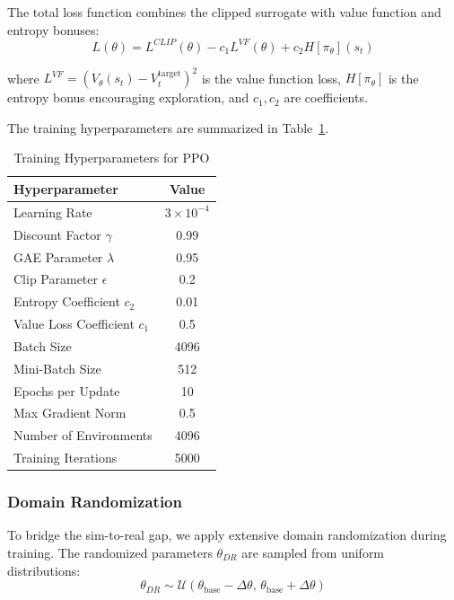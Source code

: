 The total loss function combines the clipped surrogate with value function and entropy bonuses:
\begin{equation}
    L(\theta) = L^{CLIP}(\theta) - c_1 L^{VF}(\theta) + c_2 H[\pi_\theta](s_t)
\end{equation}

where $L^{VF} = (V_\theta(s_t) - V_t^{\text{target}})^2$ is the value function loss, $H[\pi_\theta]$ is the entropy bonus encouraging exploration, and $c_1, c_2$ are coefficients.

The training hyperparameters are summarized in Table~\ref{tab:hyperparameters}.

\begin{table}[!t]
\renewcommand{\arraystretch}{1.3}
\caption{Training Hyperparameters for PPO}
\label{tab:hyperparameters}
\centering
\begin{tabular}{lc}
\hline\hline
\textbf{Hyperparameter} & \textbf{Value} \\ \hline
Learning Rate & $3 \times 10^{-4}$ \\
Discount Factor $\gamma$ & 0.99 \\
GAE Parameter $\lambda$ & 0.95 \\
Clip Parameter $\epsilon$ & 0.2 \\
Entropy Coefficient $c_2$ & 0.01 \\
Value Loss Coefficient $c_1$ & 0.5 \\
Batch Size & 4096 \\
Mini-Batch Size & 512 \\
Epochs per Update & 10 \\
Max Gradient Norm & 0.5 \\
Number of Environments & 4096 \\
Training Iterations & 5000 \\ \hline\hline
\end{tabular}
\end{table}

\subsubsection{Domain Randomization}
\label{subsec:domain_randomization}

To bridge the sim-to-real gap, we apply extensive domain randomization during training. The randomized parameters $\theta_{DR}$ are sampled from uniform distributions:
\begin{equation}
    \theta_{DR} \sim \mathcal{U}(\theta_{\text{base}} - \Delta\theta, \, \theta_{\text{base}} + \Delta\theta)
\end{equation}

